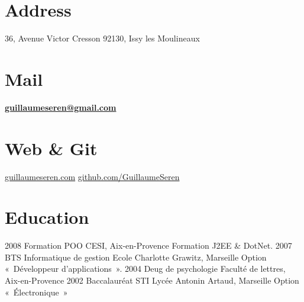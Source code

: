 \documentclass[print]{GuillaumeSeren-cv}
\begin{document}

\begin{aside}
  \section{Address}
    36, Avenue Victor Cresson
    92130, Issy les Moulineaux
    ~
  \section{Mail}
    \href{mailto:guillaumeseren@gmail.com}{\textbf{guillaumeseren@gmail.com}}
    ~
  \section{Web \& Git}
    \href{http://guillaumeseren.com/}{guillaumeseren.com}
    \href{https://github.com/GuillaumeSeren}{github.com/GuillaumeSeren}
    ~
\end{aside}

\section{Education}
\begin{entrylist}
  \entry
    {2008}
    {Formation POO}
    {CESI, Aix-en-Provence}
    {Formation J2EE \& DotNet.}
  \entry
    {2007}
    {BTS Informatique de gestion}
    {Ecole Charlotte Grawitz, Marseille}
    {Option « Développeur d'applications ».}
  \entry
    {2004}
    {Deug de psychologie}
    {Faculté de lettres, Aix-en-Provence}
    {}
  \entry
    {2002}
    {Baccalauréat STI}
    {Lycée Antonin Artaud, Marseille}
    {Option « Électronique »}
\end{entrylist}
\end{document}
